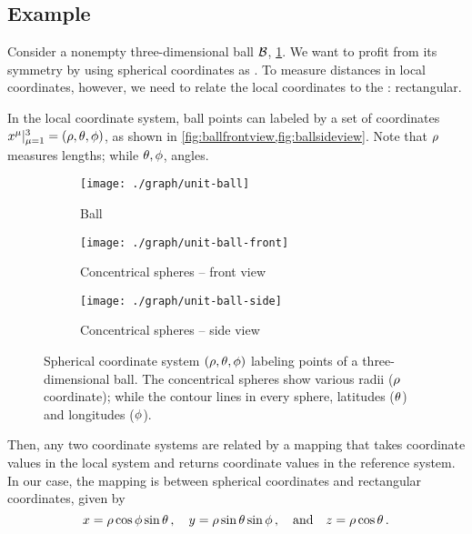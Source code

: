 \subsection{Example}
%
Consider a nonempty three-dimensional ball $\mathcal{B}$, \cref{fig:ball}. We want to profit from its symmetry by using spherical coordinates as . To measure distances in local coordinates, however, we need to relate the local coordinates to the : rectangular.

In the local coordinate system, ball points can labeled by a set of coordinates $\coordsys{\tvec\pos\mu}{\mu = 1}{3} = \tuple{\sxpos,\sypos,\szpos}$, as shown in \cref{fig:ballfrontview,fig:ballsideview}. Note that $\rho$ measures lengths; while $\theta,\phi$, angles.
%
\begin{figure}[b]
  \capstart
  \centering
  \begin{subfigure}[t]{0.3\textwidth}
    \texttt{[image: ./graph/unit-ball]}
    \caption{Ball}
    \label{fig:ball}
  \end{subfigure}
  \quad
  \begin{subfigure}[t]{0.3\textwidth}
    \texttt{[image: ./graph/unit-ball-front]}
    \caption{Concentrical spheres -- front view}
    \label{fig:ballsideview}
  \end{subfigure}
  \qquad
  \begin{subfigure}[t]{0.3\textwidth}
    \texttt{[image: ./graph/unit-ball-side]}
    \caption{Concentrical spheres -- side view}
    \label{fig:ballfrontview}
  \end{subfigure}
  \caption{Spherical coordinate system $\tuple{\sxpos,\sypos,\szpos}$ labeling points of a three-dimensional ball. The concentrical spheres show various radii ($\rho$ coordinate); while the contour lines in every sphere, latitudes ($\theta$) and longitudes ($\phi$).}
  \label{fig:ballfrontsideview}
\end{figure}

Then, any two coordinate systems are related by a mapping that takes coordinate values in the local system and returns coordinate values in the reference system. In our case, the mapping is between spherical coordinates and rectangular coordinates, given by
%
\begin{equation*}
  x = \rho\cos\phi\sin\theta\,,\quad
  y = \rho\sin\theta\sin\phi\,,\quad\text{and}\quad
  z = \rho\cos\theta\,.
\end{equation*}

